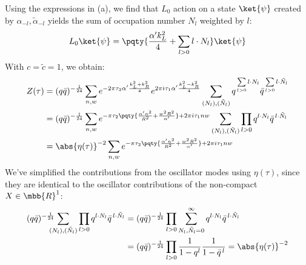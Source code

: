 \documentclass[a4paper,10pt]{article}
\begin{document}
\begin{enumerate}
\begin{enumerate}
	Using the expressions in (a), we find that $L_0$ action on a state $\ket{\psi}$ created by $\alpha_{-l},\tilde{\alpha}_{-l}$ yields the sum of occupation number $N_l$ weighted by $l$:
	\begin{equation}
		L_0 \ket{\psi}
		= \pqty{
				\frac{\alpha'k_L^2}{4}
				+ \sum_{l > 0} l\cdot N_l
			} \ket{\psi}
	\end{equation}
	With $c = \tilde{c} = 1$, we obtain:
	\begin{equation}
	\begin{aligned}
		Z(\tau)
		&= (q\bar{q})^{-\frac{1}{24}}
			\sum_{n,w}
				e^{
					- 2\pi \tau_2
					\alpha'\frac{k_L^2 + k_R^2}{4}
				}
				e^{
					2\pi i \tau_1
					\alpha'\frac{k_L^2 - k_R^2}{4}
				}
			\sum_{(N_l),(\tilde{N}_l)}
				q^{
					\,\sum\limits_{l>0}  l\cdot N_l
				}
				\bar{q}^{
					\,\sum\limits_{l>0}  l\cdot \tilde{N}_l
				} \\
		&= (q\bar{q})^{-\frac{1}{24}}
			\sum_{n,w}
				e^{
					- \pi \tau_2 \pqty{
						\frac{\alpha'n^2}{R^2}
						+ \frac{w^2 R^2}{\alpha'}
					}
					+ 2\pi i \tau_1 nw
				}
			\sum_{(N_l),(\tilde{N}_l)} \prod_{l>0}
				q^{l\cdot N_l}
				\bar{q}^{\,l\cdot \tilde{N}_l} \\
		&= \abs{\eta(\tau)}^{-2}
			\sum_{n,w}
				e^{
					- \pi \tau_2 \pqty{
						\frac{\alpha'n^2}{R^2}
						+ \frac{w^2 R^2}{\alpha'}
					}
					+ 2\pi i \tau_1 nw
				}
	\end{aligned}
	\end{equation}
	We've simplified the contributions from the oscillator modes using $\eta(\tau)$, since they are identical to the oscillator contributions of the non-compact $X\in\mbb{R}^1$:
	\begin{equation}
	\begin{aligned}
		(q\bar{q})^{-\frac{1}{24}}\!\!\!\!\!
		\sum_{(N_l),(\tilde{N}_l)} \prod_{l>0}
			q^{l\cdot N_l}
			\bar{q}^{\,l\cdot \tilde{N}_l}
		&= (q\bar{q})^{-\frac{1}{24}}
			\prod_{l>0} \sum_{N_l,\tilde{N}_l = 0}^\infty
				q^{l\cdot N_l}
				\bar{q}^{\,l\cdot \tilde{N}_l} \\
		&= (q\bar{q})^{-\frac{1}{24}}
			\prod_{l>0}
				\frac{1}{1 - q^l}
				\frac{1}{1 - \bar{q}^{\,l}}
		= \abs{\eta(\tau)}^{-2}
	\end{aligned}
	\end{equation}
	

\end{enumerate}
\end{enumerate}
\end{document}
